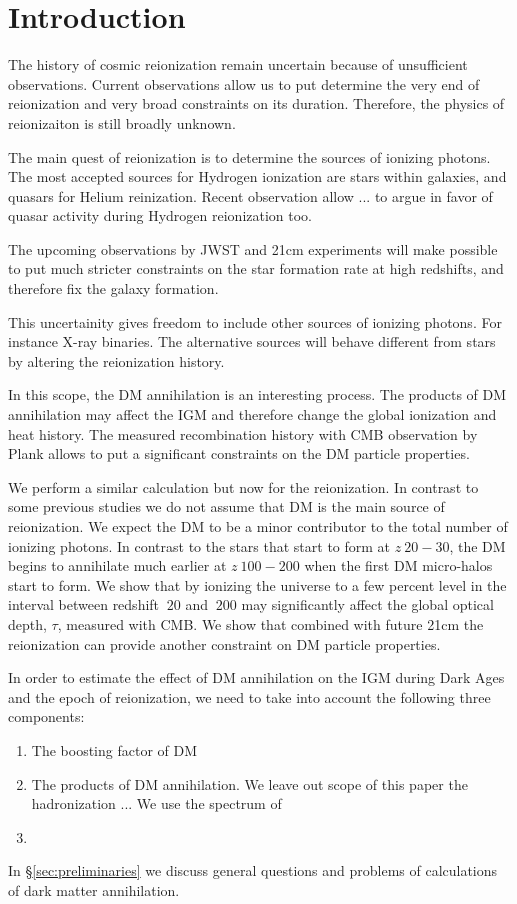 \section{Introduction}

The history of cosmic reionization remain uncertain because of unsufficient observations. Current observations allow us to put determine the very end of reionization and very broad constraints on its duration. Therefore, the physics of reionizaiton is still broadly unknown.

The main quest of reionization is to determine the sources of ionizing photons. The most accepted sources for Hydrogen ionization are stars within galaxies, and quasars for Helium reinization. Recent observation allow ... to argue in favor of quasar activity during Hydrogen reionization too.

The upcoming observations by JWST and 21cm experiments will make possible to put much stricter constraints on the star formation rate at high redshifts, and therefore fix the galaxy formation.

This uncertainity gives freedom to include other sources of ionizing photons. For instance X-ray binaries. The alternative sources will behave different from stars by altering the reionization history. 

In this scope, the DM annihilation is an interesting process. The products of DM annihilation may affect the IGM and therefore change the global ionization and heat history. The measured recombination history with CMB observation by Plank allows \cite{2015arXiv150603811S} to put a significant constraints on the DM particle properties.

We perform a similar calculation but now for the reionization. In contrast to some previous studies \cite{2009JCAP...10..009C, 2009PhRvD..80c5007B} we do not assume that DM is the main source of reionization. We expect the DM to be a minor contributor to the total number of ionizing photons. In contrast to the stars that start to form at $z~20-30$, the DM begins to annihilate much earlier at $z~100-200$ when the first DM micro-halos start to form. We show that by ionizing the universe to a few percent level in the interval between redshift $~20$ and $~200$ may significantly affect the global optical depth, $\tau$, measured with CMB. We show that combined with future 21cm the reionization can provide another constraint on DM particle properties.

In order to estimate the effect of DM annihilation on the IGM during Dark Ages and the epoch of reionization, we need to take into account the following three components:
\begin{enumerate}
\item The boosting factor of DM  
\item The products of DM annihilation. We leave out scope of this paper the hadronization ... We use the spectrum of 
\item
\end{enumerate}
In \S\ref{sec:preliminaries} we discuss general questions and problems of calculations of dark matter annihilation.

